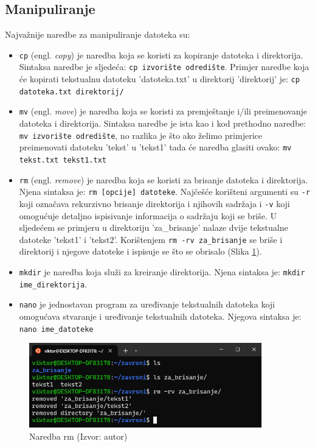 \documentclass{foi}
\begin{document}
\subsection{Manipuliranje}
Najvažnije naredbe za manipuliranje datoteka su:
\begin{itemize}
    \item \verb|cp| (engl. \textit{copy}) je naredba koja se koristi za kopiranje datoteka i direktorija. Sintaksa naredbe je sljedeća: \verb|cp izvorište odredište|. Primjer naredbe koja će kopirati tekstualnu datoteku 'datoteka.txt' u direktorij 'direktorij' je: \verb|cp datoteka.txt direktorij/|
    \item \verb|mv| (engl. \textit{move}) je naredba koja se koristi za premještanje i/ili preimenovanje datoteka i direktorija. Sintaksa naredbe je ista kao i kod prethodno naredbe: \verb|mv izvorište odredište|, no razlika je što ako želimo primjerice preimenovati datoteku 'tekst' u 'tekst1' tada će naredba glasiti ovako: \verb|mv tekst.txt tekst1.txt|
    \item \verb|rm| (engl. \textit{remove}) je naredba koja se koristi za brisanje datoteka i direktorija. Njena sintaksa je: \verb|rm [opcije] datoteke|. Najčešće korišteni argumenti su \verb|-r| koji označava rekurzivno brisanje direktorija i njihovih sadržaja i \verb|-v| koji omogućuje detaljno ispisivanje informacija o sadržaju koji se briše. U sljedećem se primjeru u direktoriju 'za\_brisanje' nalaze dvije tekstualne datoteke 'tekst1' i 'tekst2'. Korištenjem \verb|rm -rv za_brisanje| se briše i direktorij i njegove datoteke i ispisuje se što se obrisalo (Slika \ref{fig:rm}).
    \item \verb|mkdir| je naredba koja služi za kreiranje direktorija. Njena sintaksa je: \verb|mkdir ime_direktorija|.
    \item \verb|nano| je jednostavan program za uređivanje tekstualnih datoteka koji omogućava stvaranje i uređivanje tekstualnih datoteka. Njegova sintaksa je: \verb|nano ime_datoteke|
\end{itemize}
\begin{figure}[H]
    \centering
    \includegraphics[width=0.9\textwidth]{slike/rm.png}
    \caption{Naredba rm (Izvor: autor)}
    \label{fig:rm}
\end{figure}
\end{document}
